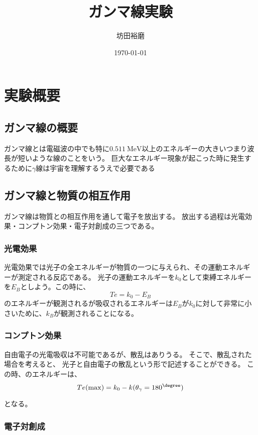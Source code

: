 \documentclass[titlepage]{ltjsarticle}
\begin{document}
\title{ガンマ線実験}
\author{坊田裕磨}
\date{\today}
\maketitle


\section{実験概要}
\subsection{ガンマ線の概要}


ガンマ線とは電磁波の中でも特に\(0.511\ \mathrm{MeV}\)以上のエネルギーの大きいつまり波長が短いような線のことをいう。
巨大なエネルギー現象が起こった時に発生するために\(\gamma\)線は宇宙を理解するうえで必要である

\subsection{ガンマ線と物質の相互作用}

ガンマ線は物質との相互作用を通して電子を放出する。
放出する過程は光電効果・コンプトン効果・電子対創成の三つである。
\subsubsection{光電効果}
光電効果では光子の全エネルギーが物質の一つに与えられ、その運動エネルギーが測定される反応である。
光子の運動エネルギーを\(k_0\)として束縛エネルギーを\(E_B\)としよう。この時に、
\begin{equation}
  Te = k_0- E_B
\end{equation}
のエネルギーが観測されるが吸収されるエネルギーは\(E_B\)が\(k_0\)に対して非常に小さいために、\(k_B\)が観測されることになる。

\subsubsection{コンプトン効果}
自由電子の光電吸収は不可能であるが、散乱はありうる。
そこで、散乱された場合を考えると、
光子と自由電子の散乱という形で記述することができる。
この時、のエネルギーは、
\begin{equation}
  Te(\max) = k_0 - k(\theta_\gamma = 180^\degree)
\end{equation}

となる。

\subsubsection{電子対創成}
\end{document}
